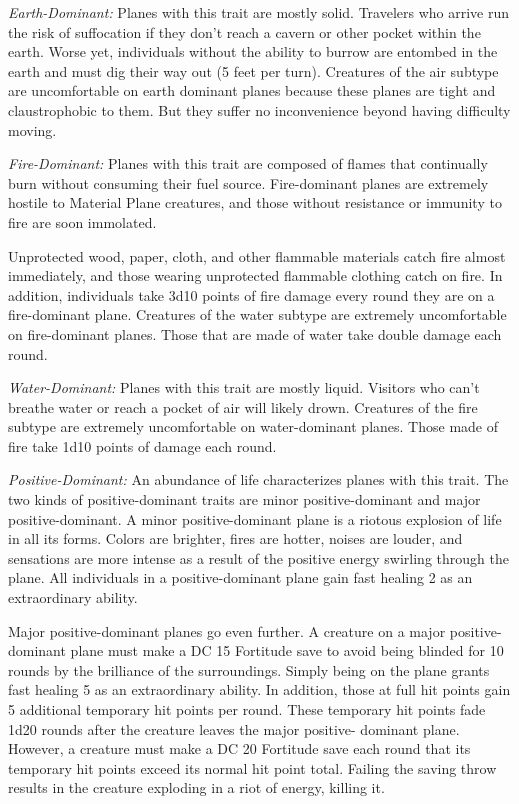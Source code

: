 \documentclass{article}
\begin{document}
\textit{Earth-Dominant:} Planes with this trait are mostly solid. Travelers who 
arrive run the risk of suffocation if they don't reach a cavern or other pocket 
within the earth. Worse yet, individuals without the ability to burrow are entombed 
in the earth and must dig their way out (5 feet per turn). Creatures of the air 
subtype are uncomfortable on earth dominant planes because these planes are tight 
and claustrophobic to them. But they suffer no inconvenience beyond having difficulty 
moving.

\textit{Fire-Dominant: }Planes with this trait are composed of flames that continually 
burn without consuming their fuel source. Fire-dominant planes are extremely hostile 
to Material Plane creatures, and those without resistance or immunity to fire are 
soon immolated.

Unprotected wood, paper, cloth, and other flammable materials catch fire almost 
immediately, and those wearing unprotected flammable clothing catch on fire. In 
addition, individuals take 3d10 points of fire damage every round they are on a 
fire-dominant plane. Creatures of the water subtype are extremely uncomfortable 
on fire-dominant planes. Those that are made of water take double damage each round.

\textit{Water-Dominant:} Planes with this trait are mostly liquid. Visitors who 
can't breathe water or reach a pocket of air will likely drown. Creatures of the 
fire subtype are extremely uncomfortable on water-dominant planes. Those made of 
fire take 1d10 points of damage each round.

\textit{Positive-Dominant: }An abundance of life characterizes planes with this 
trait. The two kinds of positive-dominant traits are minor positive-dominant and 
major positive-dominant. A minor positive-dominant plane is a riotous explosion 
of life in all its forms. Colors are brighter, fires are hotter, noises are louder, 
and sensations are more intense as a result of the positive energy swirling through 
the plane. All individuals in a positive-dominant plane gain fast healing 2 as 
an extraordinary ability.

Major positive-dominant planes go even further. A creature on a major positive-dominant 
plane must make a DC 15 Fortitude save to avoid being blinded for 10 rounds by 
the brilliance of the surroundings. Simply being on the plane grants fast healing 
5 as an extraordinary ability. In addition, those at full hit points gain 5 additional 
temporary hit points per round. These temporary hit points fade 1d20 rounds after 
the creature leaves the major positive- dominant plane. However, a creature must 
make a DC 20 Fortitude save each round that its temporary hit points exceed its 
normal hit point total. Failing the saving throw results in the creature exploding 
in a riot of energy, killing it.
\end{document}
